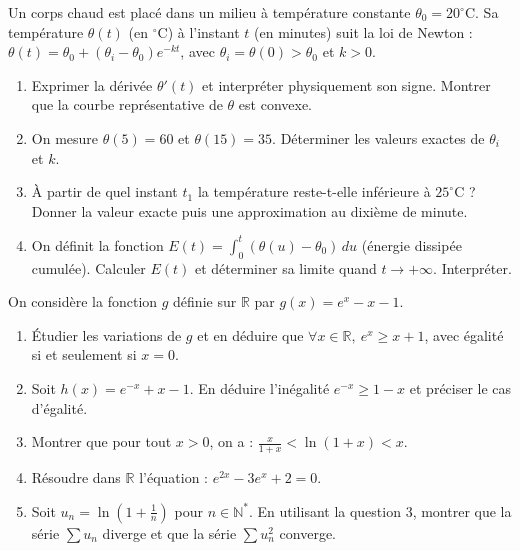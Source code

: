 \documentclass[11pt]{article}
\begin{document}
\begin{exercice}
Un corps chaud est placé dans un milieu à température constante $\theta_0 = 20^{\circ}\text{C}$. Sa température $\theta(t)$ (en $^{\circ}\text{C}$) à l'instant $t$ (en minutes) suit la loi de Newton : $\theta(t) = \theta_0 + (\theta_i - \theta_0)e^{-kt}$, avec $\theta_i = \theta(0) > \theta_0$ et $k > 0$.

\begin{enumerate}
    \item Exprimer la dérivée $\theta'(t)$ et interpréter physiquement son signe. Montrer que la courbe représentative de $\theta$ est convexe.
    \item On mesure $\theta(5) = 60$ et $\theta(15) = 35$. Déterminer les valeurs exactes de $\theta_i$ et $k$.
    \item À partir de quel instant $t_1$ la température reste-t-elle inférieure à $25^{\circ}\text{C}$ ? Donner la valeur exacte puis une approximation au dixième de minute.
    \item On définit la fonction $E(t) = \int_0^t (\theta(u) - \theta_0)\,du$ (énergie dissipée cumulée). Calculer $E(t)$ et déterminer sa limite quand $t \to +\infty$. Interpréter.
\end{enumerate}
\end{exercice}

\begin{exercice}
On considère la fonction $g$ définie sur $\mathbb{R}$ par $g(x) = e^x - x - 1$.

\begin{enumerate}
    \item Étudier les variations de $g$ et en déduire que $\forall x \in \mathbb{R},\ e^x \ge x + 1$, avec égalité si et seulement si $x=0$.
    \item Soit $h(x) = e^{-x} + x - 1$. En déduire l'inégalité $e^{-x} \ge 1 - x$ et préciser le cas d'égalité.
    \item Montrer que pour tout $x > 0$, on a : $\displaystyle \frac{x}{1+x} < \ln(1+x) < x$.
    \item Résoudre dans $\mathbb{R}$ l'équation : $e^{2x} - 3e^x + 2 = 0$.
    \item Soit $u_n = \ln\left(1 + \frac{1}{n}\right)$ pour $n \in \mathbb{N}^*$. En utilisant la question 3, montrer que la série $\sum u_n$ diverge et que la série $\sum u_n^2$ converge.
\end{enumerate}
\end{exercice}
\end{document}
